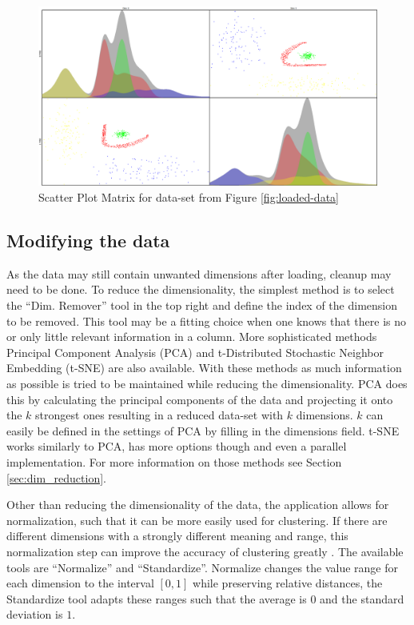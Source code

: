 \documentclass[
	a4paper,
	english,
	twoside,
	openright,               
	11pt                            
	]{report}
\begin{document}
\begin{figure}[h]
	\centering
	\includegraphics[scale=.25]{scatter_matrix}
	\caption{Scatter Plot Matrix for data-set from Figure \ref{fig:loaded-data}}
	\label{fig:scatter_matrix}
\end{figure}

\subsection{Modifying the data}

As the data may still contain unwanted dimensions after loading, cleanup may need to be done. To reduce the dimensionality, the simplest method is to select the ``Dim. Remover'' tool in the top right and define the index of the dimension to be removed. This tool may be a fitting choice when one knows that there is no or only little relevant information in a column. More sophisticated methods Principal Component Analysis (PCA) \cite{pca} and t-Distributed Stochastic Neighbor Embedding (t-SNE) \cite{Maaten2008VisualizingDU} are also available. With these methods as much information as possible is tried to be maintained while reducing the dimensionality. PCA does this by calculating the principal components of the data and projecting it onto the $k$ strongest ones resulting in a reduced data-set with $k$ dimensions. $k$ can easily be defined in the settings of PCA by filling in the dimensions field. t-SNE works similarly to PCA, has more options though and even a parallel implementation. For more information on those methods see Section \ref{sec:dim_reduction}.

Other than reducing the dimensionality of the data, the application allows for normalization, such that it can be more easily used for clustering. If there are different dimensions with a strongly different meaning and range, this normalization step can improve the accuracy of clustering greatly \cite{normalization}. The available tools are ``Normalize'' and ``Standardize''. Normalize changes the value range for each dimension to the interval $[0,1]$ while preserving relative distances, the Standardize tool adapts these ranges such that the average is $0$ and the standard deviation is $1$.
\end{document}
